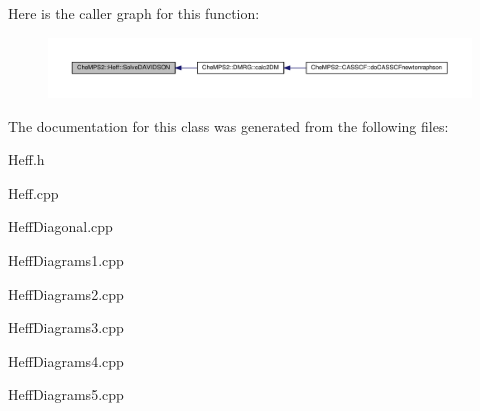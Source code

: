 Here is the caller graph for this function\-:\nopagebreak
\begin{figure}[H]
\begin{center}
\leavevmode
\includegraphics[width=350pt]{classCheMPS2_1_1Heff_ab8ccd23cc035ed40e13705c3f2e581a3_icgraph}
\end{center}
\end{figure}




The documentation for this class was generated from the following files\-:\begin{DoxyCompactItemize}
\item 
Heff.\-h\item 
Heff.\-cpp\item 
Heff\-Diagonal.\-cpp\item 
Heff\-Diagrams1.\-cpp\item 
Heff\-Diagrams2.\-cpp\item 
Heff\-Diagrams3.\-cpp\item 
Heff\-Diagrams4.\-cpp\item 
Heff\-Diagrams5.\-cpp\end{DoxyCompactItemize}
